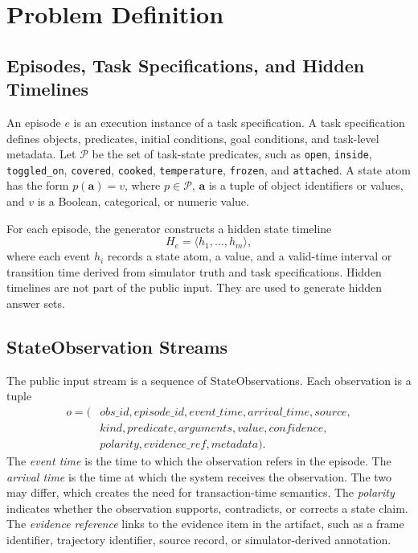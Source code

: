 \documentclass[conference]{IEEEtran}
\begin{document}
\section{Problem Definition}
\label{sec:problem}

\subsection{Episodes, Task Specifications, and Hidden Timelines}

An episode $e$ is an execution instance of a task specification. A task specification defines objects, predicates, initial conditions, goal conditions, and task-level metadata. Let $\mathcal{P}$ be the set of task-state predicates, such as \texttt{open}, \texttt{inside}, \texttt{toggled\_on}, \texttt{covered}, \texttt{cooked}, \texttt{temperature}, \texttt{frozen}, and \texttt{attached}. A state atom has the form $p(\mathbf{a})=v$, where $p\in\mathcal{P}$, $\mathbf{a}$ is a tuple of object identifiers or values, and $v$ is a Boolean, categorical, or numeric value.

For each episode, the generator constructs a hidden state timeline
\begin{equation}
    H_e = \langle h_1,\ldots,h_m\rangle,
\end{equation}
where each event $h_i$ records a state atom, a value, and a valid-time interval or transition time derived from simulator truth and task specifications. Hidden timelines are not part of the public input. They are used to generate hidden answer sets.

\subsection{StateObservation Streams}

The public input stream is a sequence of StateObservations. Each observation is a tuple
\begin{equation}
\begin{split}
o = (&obs\_id, episode\_id, event\_time, arrival\_time, source,\\
     &kind, predicate, arguments, value, confidence,\\
     &polarity, evidence\_ref, metadata).
\end{split}
\end{equation}
The \emph{event time} is the time to which the observation refers in the episode. The \emph{arrival time} is the time at which the system receives the observation. The two may differ, which creates the need for transaction-time semantics. The \emph{polarity} indicates whether the observation supports, contradicts, or corrects a state claim. The \emph{evidence reference} links to the evidence item in the artifact, such as a frame identifier, trajectory identifier, source record, or simulator-derived annotation.
\end{document}
